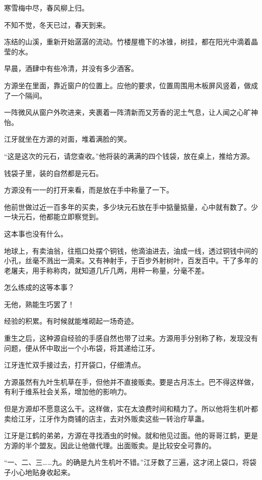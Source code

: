 
\begin{this_body}

寒雪梅中尽，春风柳上归。

不知不觉，冬天已过，春天到来。

冻结的山溪，重新开始潺潺的流动。竹楼屋檐下的冰锥，树挂，都在阳光中滴着晶莹的水。

早晨，酒肆中有些冷清，并没有多少酒客。

方源坐在里面，靠近窗户的位置上。应他的要求，位置周围用木板屏风竖着，做成了一个隔间。

一阵微风从窗户外吹进来，夹裹着一阵清新而又芳香的泥土气息，让人闻之心旷神怡。

江牙就坐在方源的对面，堆着满脸的笑。

“这是这次的元石，请您查收。”他将装的满满的四个钱袋，放在桌上，推给方源。

钱袋子里，装的自然都是元石。

方源没有一一的打开来看，而是放在手中称量了一下。

他前世做过近一百多年的买卖，多少块元石放在手中掂量掂量，心中就有数了。少一块元石，他都能立即察觉到。

这本事也没有什么。

地球上，有卖油翁，往瓶口处摆个铜钱，他滴油进去，油成一线，透过铜钱中间的小孔，丝毫不溅出一滴来。又有神射手，于百步外射树叶，百发百中。干了多年的老屠夫，用手称称肉，就知道几斤几两，用秤一称量，分毫不差。

怎么练成的这等本事？

无他，熟能生巧罢了！

经验的积累。有时候就能堆砌起一场奇迹。

重生之后，这种源自经验的手感自然也带了过来。方源用手分别称了称，发现没有问题，便从怀中取出一个小布袋，将其递给江牙。

江牙连忙双手接过去，打开袋口，仔细清点。

方源虽然有九叶生机草在手，但他并不直接贩卖。要是古月冻土。巴不得这样做，有利于维系社会关系，增加他的影响力。

但是方源却不愿意这么干。这样做，实在太浪费时间和精力了。所以他将生机叶都卖给江牙，江牙作为商铺的店主，去对外贩卖这些一转治疗草蛊。

江牙是江鹤的弟弟，方源在寻找酒虫的时候。就和他见过面。他的哥哥江鹤，更是方源的半个盟友。因此让他做代理。出面贩卖。是比较安全可靠的。

“一、二、三……九。的确是九片生机叶不错。”江牙数了三遍，这才闭上袋口，将袋子小心地贴身收起来。


\end{this_body}
